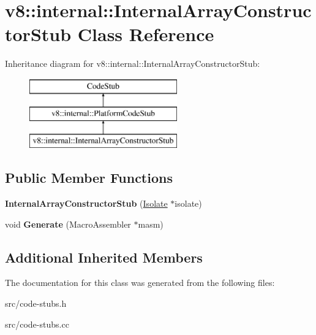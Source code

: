 \hypertarget{classv8_1_1internal_1_1_internal_array_constructor_stub}{}\section{v8\+:\+:internal\+:\+:Internal\+Array\+Constructor\+Stub Class Reference}
\label{classv8_1_1internal_1_1_internal_array_constructor_stub}
Inheritance diagram for v8\+:\+:internal\+:\+:Internal\+Array\+Constructor\+Stub\+:\begin{figure}[H]
\begin{center}
\leavevmode
\includegraphics[height=3.000000cm]{classv8_1_1internal_1_1_internal_array_constructor_stub}
\end{center}
\end{figure}
\subsection*{Public Member Functions}
\begin{DoxyCompactItemize}
\item 
\hypertarget{classv8_1_1internal_1_1_internal_array_constructor_stub_af11d51976f9c56f1b801e42f9e24b2e1}{}{\bfseries Internal\+Array\+Constructor\+Stub} (\hyperlink{classv8_1_1internal_1_1_isolate}{Isolate} $\ast$isolate)\label{classv8_1_1internal_1_1_internal_array_constructor_stub_af11d51976f9c56f1b801e42f9e24b2e1}

\item 
\hypertarget{classv8_1_1internal_1_1_internal_array_constructor_stub_a5916d40b2b85a63c295ed0b546aa3f93}{}void {\bfseries Generate} (Macro\+Assembler $\ast$masm)\label{classv8_1_1internal_1_1_internal_array_constructor_stub_a5916d40b2b85a63c295ed0b546aa3f93}

\end{DoxyCompactItemize}
\subsection*{Additional Inherited Members}


The documentation for this class was generated from the following files\+:\begin{DoxyCompactItemize}
\item 
src/code-\/stubs.\+h\item 
src/code-\/stubs.\+cc\end{DoxyCompactItemize}
